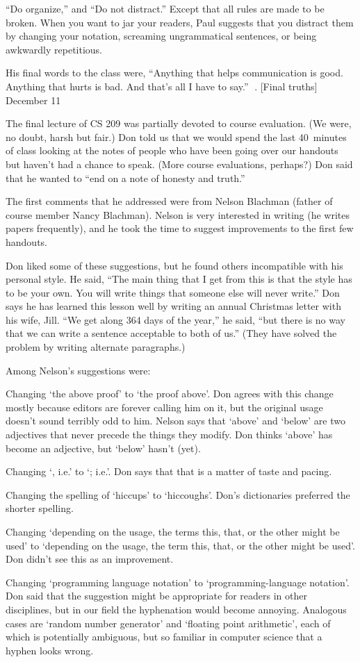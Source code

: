 ``Do organize,'' and ``Do not distract.'' Except that all rules are made to be
broken.  When you want to jar your readers, Paul suggests that you distract
them by changing your notation, screaming ungrammatical sentences, or being
awkwardly repetitious.

His final words to the class were, ``Anything that helps communication
is good.  Anything that hurts is bad.  And that's all I have to say.''
. [Final truths] \tll December 11

The final lecture of CS 209 was partially devoted to course evaluation.
(We were, no doubt, harsh but fair.)  Don told us that we would spend the
last 40~minutes of class  looking at the notes of people who have
been going over our handouts but haven't had a chance to speak. (More
course evaluations, perhaps?)  Don said that he wanted to ``end on a note
of honesty and truth.''

The first comments that he addressed were from Nelson Blachman (father of
course member Nancy Blachman). Nelson is very interested in writing (he
writes papers frequently), and he took the time to suggest improvements to
the first few handouts.  

Don liked some of these suggestions, but he found others incompatible
with his personal style.  He said, ``The main thing that I get from this is
that the style has to be your own.  You will write things that someone
else will never write.''  Don says he has learned this lesson well
 by writing an annual Christmas letter with his wife, Jill.
``We get along 364 days of the year,'' he said, ``but there is no way that we
can write a sentence acceptable to both of us.''  (They
have solved the problem by writing alternate paragraphs.)

Among Nelson's suggestions were:

{\narrower\smallskip\noindent
	Changing `the above proof' to `the proof above'.  Don agrees with
	this change mostly because editors are forever calling him on it,
	but the original usage doesn't sound terribly
odd to him.  Nelson says that 
	`above' and `below' are two adjectives that never precede the things 
	they modify. Don thinks `above' has become an adjective, but
`below' hasn't (yet).
	
	Changing `, i.e.' to `; i.e.'.  Don says that that is a matter of
	taste and pacing.
	
	Changing the spelling of `hiccups' to `hiccoughs'.  Don's
	dictionaries preferred the shorter spelling.
	
	Changing `depending on the usage, the terms this, that, or the
	other might be used' to `depending on the usage, the term this,
	that, or the other might be used'.  Don didn't see this as
an improvement.
	
	Changing `programming language notation' to `programming-language
	notation'.  Don said that the suggestion might be appropriate for
readers in 
	other disciplines, but in our field the hyphenation  would
	become annoying.  Analogous cases are `random number generator' and
	`floating point arithmetic', each of which is potentially
	ambiguous, but  so familiar in computer science that a hyphen looks wrong.
\smallskip}

